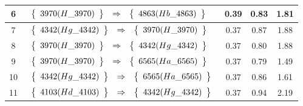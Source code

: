 \begin{longtable}{| c | l | c | c | c |}
6 & $\begin{array}{c c c}\left\{\begin{array}{c}3970 (H\_3970)\end{array}\right\} & \Rightarrow & \left\{\begin{array}{c}4863 (Hb\_4863)\end{array}\right\}\end{array}$ & 0.39 & 0.83 & 1.81 \\ \hline
7 & $\begin{array}{c c c}\left\{\begin{array}{c}4342 (Hg\_4342)\end{array}\right\} & \Rightarrow & \left\{\begin{array}{c}3970 (H\_3970)\end{array}\right\}\end{array}$ & 0.37 & 0.87 & 1.88 \\ \hline
8 & $\begin{array}{c c c}\left\{\begin{array}{c}3970 (H\_3970)\end{array}\right\} & \Rightarrow & \left\{\begin{array}{c}4342 (Hg\_4342)\end{array}\right\}\end{array}$ & 0.37 & 0.80 & 1.88 \\ \hline
9 & $\begin{array}{c c c}\left\{\begin{array}{c}3970 (H\_3970)\end{array}\right\} & \Rightarrow & \left\{\begin{array}{c}6565 (Ha\_6565)\end{array}\right\}\end{array}$ & 0.37 & 0.79 & 1.49 \\ \hline
10 & $\begin{array}{c c c}\left\{\begin{array}{c}4342 (Hg\_4342)\end{array}\right\} & \Rightarrow & \left\{\begin{array}{c}6565 (Ha\_6565)\end{array}\right\}\end{array}$ & 0.37 & 0.86 & 1.61 \\ \hline
11 & $\begin{array}{c c c}\left\{\begin{array}{c}4103 (Hd\_4103)\end{array}\right\} & \Rightarrow & \left\{\begin{array}{c}4342 (Hg\_4342)\end{array}\right\}\end{array}$ & 0.37 & 0.94 & 2.19 \\ \hline

\end{longtable}
